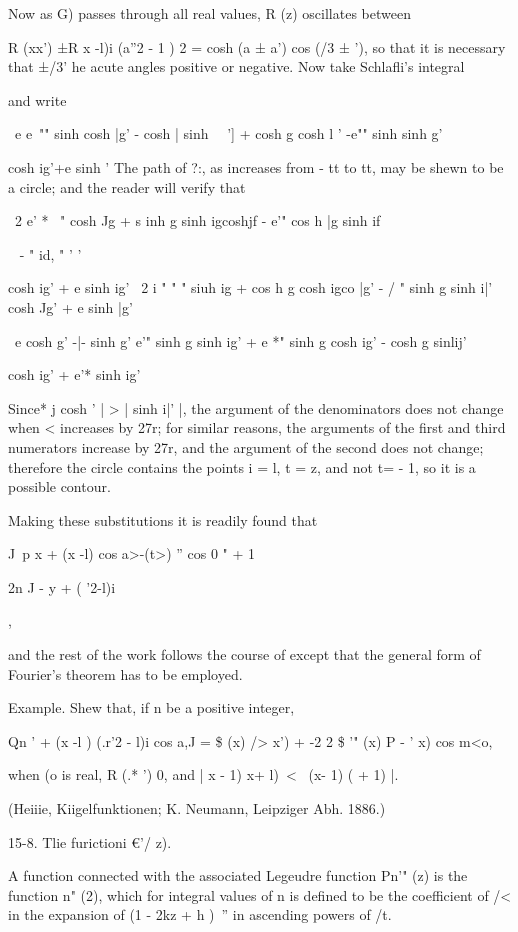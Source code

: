 {{{Now as G) passes through all real values, R (z) oscillates between

R (xx') ±R x -l)i (a''2 - 1 ) 2 = cosh (a ± a') cos (/3 ± '), so that
it is necessary that ±/3' he acute angles positive or negative. Now
take Schlafli's integral

and write

\ e e~"" sinh cosh |g' - cosh | sinh \ \ '] + cosh g cosh l ' -e""
sinh sinh g'

cosh ig'+e sinh ' The path of ?:, as increases from - tt to tt, may be
shewn to be a circle; and the reader will verify that

\ 2 e' * ~" cosh Jg + s inh g sinh igcoshjf - e'" cos h |g sinh if

 ~ - " id, " ' '

cosh ig' + e sinh ig' \ 2 i " " " siuh ig + cos h g cosh igco |g' - /
" sinh g sinh i|' cosh Jg' + e sinh |g'

\ e cosh g' -|- sinh g' e'" sinh g sinh ig' + e *" sinh g cosh ig' -
cosh g sinlij'

cosh ig' + e'* sinh ig'

%
%

Since* j cosh ' | > | sinh i|' |, the argument of the denominators
does not change when < increases by 27r; for similar reasons, the
arguments of the first and third numerators increase by 27r, and the
argument of the second does not change; therefore the circle contains
the points i = l, t = z, and not t= - 1, so it is a possible contour.

Making these substitutions it is readily found that

J\ p x + (x -l) cos a>-(t>) '' cos 0 " + 1

2n J - y + ( '2-l)i

,

and the rest of the work follows the course of except that the
general form of Fourier's theorem has to be employed.

Example. Shew that, if n be a positive integer,

Qn ' + (x -l ) (.r'2 - l)i cos a,J = \$ (x) /> x') + -2 2 \$ '" (x) P
- ' x) cos m<o,

when (o is real, R (.* ') 0, and | x - 1) x+ l)\ < \ (x- 1) ( + 1) |.

(Heiiie, Kiigelfunktionen; K. Neumann, Leipziger Abh. 1886.)

15-8. Tlie furictioni €'/ z).

A function connected with the associated Legeudre function Pn'" (z) is
the function n" (2), which for integral values of n is defined to be
the coefficient of /< in the expansion of (1 - 2kz + h )~'' in
ascending powers of /t.

}}}
